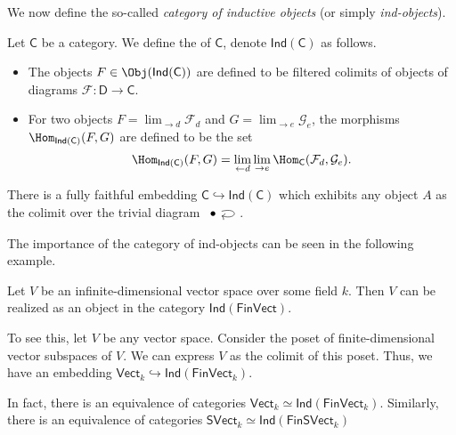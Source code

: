 \documentclass[main.tex]{subfiles}
\begin{document}
We now define the so-called \emph{category of inductive objects} (or simply \emph{ind-objects}).
\begin{definition}
  \label{def:categoryofindobjects}
  Let $\mathsf{C}$ be a category. We define the  of $\mathsf{C}$, denote $\mathsf{Ind}(\mathsf{C})$ as follows.
  \begin{itemize}
    \item The objects $F \in \Obj(\mathsf{Ind}(\mathsf{C}))$ are defined to be filtered colimits of objects of diagrams $\mathcal{F}\colon \mathsf{D} \rightarrow \mathsf{C}$.

    \item For two objects $F = \lim_{\rightarrow d}\mathcal{F}_{d}$ and $G = \lim_{\rightarrow e}\mathcal{G}_{e}$, the morphisms $\Hom_{\mathsf{Ind}(\mathsf{C})}(F, G)$ are defined to be the set
      \begin{equation*}
        \Hom_{\mathsf{Ind}(\mathsf{C})}(F, G) = \lim_{\leftarrow d} \lim_{\rightarrow e} \Hom_{\mathsf{C}}(\mathcal{F}_{d}, \mathcal{G}_{e}).
      \end{equation*}
  \end{itemize}
\end{definition}

\begin{note}
  \label{note:fullinclusionintoindcategory}
  There is a fully faithful embedding $\mathsf{C} \hookrightarrow\mathsf{Ind}(\mathsf{C})$ which exhibits any object $A$ as the colimit over the trivial diagram $\begin{tikzcd} \bullet \arrow[loop right] \end{tikzcd}$.
\end{note}

The importance of the category of ind-objects can be seen in the following example.
\begin{example}
  \label{eg:inductiveobjectsaddinfinitedimensionalvectorspaces}
  Let $V$ be an infinite-dimensional vector space over some field $k$. Then $V$ can be realized as an object in the category $\mathsf{Ind}(\mathsf{FinVect})$.

  To see this, let $V$ be any vector space. Consider the poset of finite-dimensional vector subspaces of $V$. We can express $V$ as the colimit of this poset. Thus, we have an embedding $\mathsf{Vect}_{k} \hookrightarrow \mathsf{Ind}(\mathsf{FinVect}_{k})$.

  In fact, there is an equivalence of categories $\mathsf{Vect}_{k} \simeq \mathsf{Ind}(\mathsf{FinVect}_{k})$. Similarly, there is an equivalence of categories $\mathsf{SVect}_{k} \simeq \mathsf{Ind}(\mathsf{FinSVect}_{k})$
\end{example}
\end{document}
